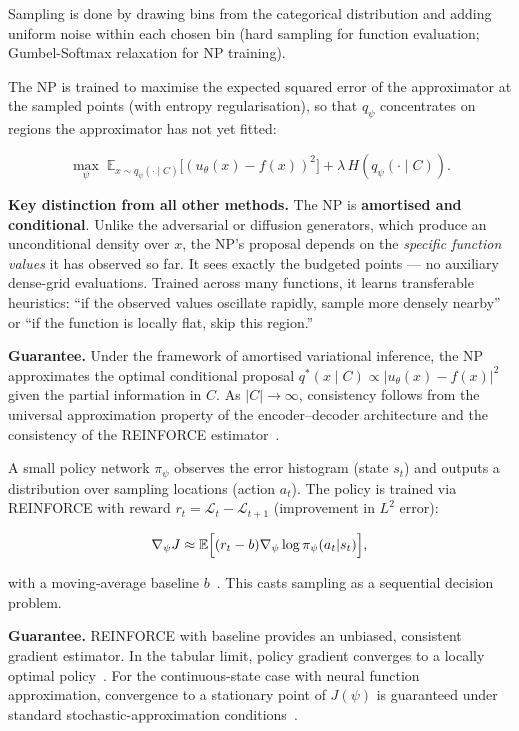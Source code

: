 \documentclass[11pt,a4paper]{article}
\begin{document}
Sampling is done by drawing bins from the categorical distribution and
adding uniform noise within each chosen bin (hard sampling for function
evaluation; Gumbel-Softmax relaxation for NP training).

The NP is trained to maximise the expected squared error of the
approximator at the sampled points (with entropy regularisation), so
that $q_\psi$ concentrates on regions the approximator has not yet fitted:

\begin{equation}
  \max_\psi\; \mathbb{E}_{x\sim q_\psi(\cdot\mid C)}
    \bigl[(u_\theta(x) - f(x))^2\bigr]
  + \lambda\, H(q_\psi(\cdot\mid C)).
\end{equation}

\textbf{Key distinction from all other methods.}
The NP is \textbf{amortised and conditional}.  Unlike the adversarial or
diffusion generators, which produce an unconditional density over $x$,
the NP's proposal depends on the \emph{specific function values} it has
observed so far.  It sees exactly the budgeted points — no auxiliary
dense-grid evaluations.  Trained across many functions, it learns
transferable heuristics: ``if the observed values oscillate rapidly,
sample more densely nearby'' or ``if the function is locally flat, skip
this region.''

\textbf{Guarantee.}
Under the framework of amortised variational inference, the NP
approximates the optimal conditional proposal
$q^*(x \mid C) \propto |u_\theta(x) - f(x)|^2$ given the partial
information in $C$.  As $|C| \to \infty$, consistency follows from the
universal approximation property of the encoder–decoder architecture
and the consistency of the REINFORCE estimator~\citep{garnelo2018conditional}.

A small policy network $\pi_\psi$ observes the error histogram (state
$s_t$) and outputs a distribution over sampling locations (action
$a_t$).  The policy is trained via REINFORCE with reward
$r_t = \mathcal{L}_t - \mathcal{L}_{t+1}$ (improvement in $L^2$ error):

\begin{equation}
  \nabla_\psi J \approx
  \mathbb{E}\Bigl[(r_t - b)\nabla_\psi\log\pi_\psi(a_t|s_t)\Bigr],
\end{equation}

with a moving-average baseline $b$~\citep{mnih2016asynchronous}.
This casts sampling as a sequential decision problem.

\textbf{Guarantee.}
REINFORCE with baseline provides an unbiased, consistent gradient
estimator.  In the tabular limit, policy gradient converges to a locally
optimal policy~\citep{sutton2018reinforcement}.  For the continuous-state
case with neural function approximation, convergence to a stationary
point of $J(\psi)$ is guaranteed under standard stochastic-approximation
conditions~\citep{bhatnagar2009natural}.
\end{document}
